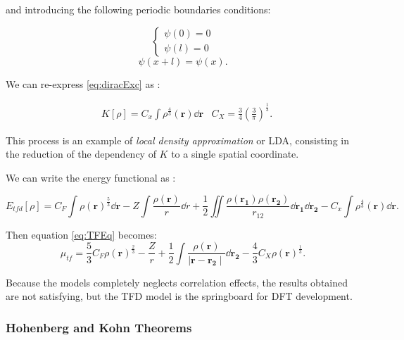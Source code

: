 \documentclass[a4paper,12pt]{article}
\begin{document}
and introducing the following periodic boundaries conditions:

\begin{equation}
\left\lbrace \begin{array}{ll}
		\psi(0) = 0 \\
		\psi(l) = 0 
	\end{array}
	\right.
\end{equation}
\begin{equation}
	\psi(x+l) = \psi(x).
\end{equation}


We can re-express \eqref{eq:diracExc} as \cite[p.105-109]{Parr} :

\begin{align}
	& K[\rho] = C_{x} \int \rho^{\frac{4}{3}}(\mathbf{r}) \dd{\mathbf{r}} & C_{X} = \frac{3}{4} \left(\frac{3}{\pi} \right)^{\frac{1}{3}}. \label{eq:DiracK}
\end{align}


This process is an example of \textit{local density approximation} or LDA, consisting in the reduction of the dependency of $K$ to a single spatial coordinate.

We can write the energy functional as :

\begin{equation}
	E_{tfd}[\rho] = C_{F} \int \rho(\mathbf{r})^{\frac{5}{3}} \dd{\mathbf{r}} 
			- Z \int \frac{\rho(\mathbf{r})}{r} \dd{r} 
			+ \frac{1}{2} \iint \frac{\rho(\mathbf{r_{1}}) \rho(\mathbf{r_{2}}) }{r_{12}} \dd{\mathbf{r_1}} \dd{\mathbf{r_2}}
			- C_{x} \int \rho^{\frac{4}{3}}(\mathbf{r}) \dd{\mathbf{r}}.
\end{equation}

Then equation \eqref{eq:TFEq} becomes:
\begin{equation}
\mu_{tf}  = \frac{5}{3} C_{F} \rho(\mathbf{r})^{\frac{2}{3}} - \frac{Z}{r} + \frac{1}{2} \int \frac{\rho(\mathbf{r})}{\mid \mathbf{r} - \mathbf{r_2} \mid} \dd{\mathbf{r_2}} - \frac{4}{3	} C_{X} \rho(\mathbf{r})^{\frac{1}{3}}.
\end{equation}

Because the models completely neglects correlation effects, the results obtained are not satisfying, but the TFD model is the springboard for DFT development.



\subsubsection{Hohenberg and Kohn Theorems}
\end{document}

